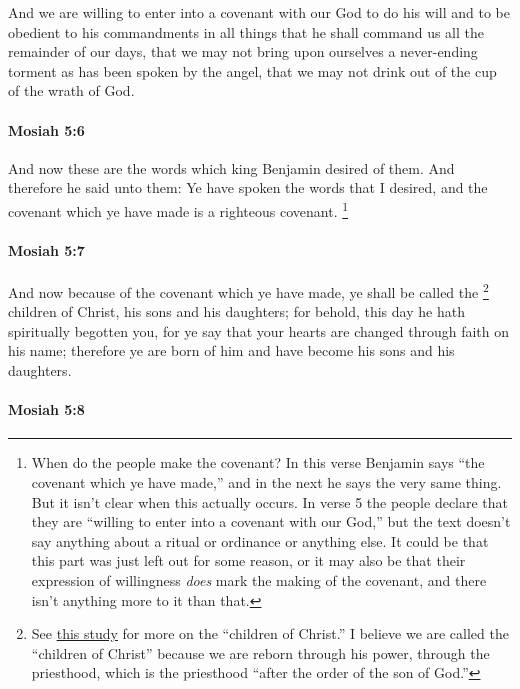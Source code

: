 			And we are willing to enter into a covenant with our God
			to do his will and to be obedient to his commandments
			in all things that he shall command us
			all the remainder of our days,
			that we may not bring upon ourselves a never-ending torment
			as has been spoken by the angel,
			that we may not drink out of the cup of the wrath of God.

		\paragraph{Mosiah 5:6} %
			\label{MOSIAH-5-6}

			And now these are the words which king Benjamin desired of them.
			And therefore he said unto them:
			Ye have spoken the words that I desired,
			and the covenant which ye have made is a righteous covenant.%
				\footnote{%
					\label{MOSIAH-5-6-NOTE-covenant}%
					When do the people make the covenant? In this verse Benjamin says ``the covenant which ye have made,'' and in the next he says the very same thing. But it isn't clear when this actually occurs. In verse 5 the people declare that they are ``willing to enter into a covenant with our God,'' but the text doesn't say anything about a ritual or ordinance or anything else. It could be that this part was just left out for some reason, or it may also be that their expression of willingness \textit{does} mark the making of the covenant, and there isn't anything more to it than that.
					}

		\paragraph{Mosiah 5:7} %
			\label{MOSIAH-5-7}

			And now because of the covenant which ye have made,
			ye shall be called the
				\footnote{%
					See \hyperref[NEWBIRTH-children-christ]{this study} for more on the ``children of Christ.'' I believe we are called the ``children of Christ'' because we are reborn through his power, through the priesthood, which is the priesthood ``after the order of the son of God.''
					}%
			children of Christ, his sons and his daughters;
			for behold, this day he hath spiritually begotten you,
			for ye say that your hearts are changed through faith on his name;
			therefore ye are born of him and have become his sons and his daughters.

		\paragraph{Mosiah 5:8} %
			\label{MOSIAH-5-8}

